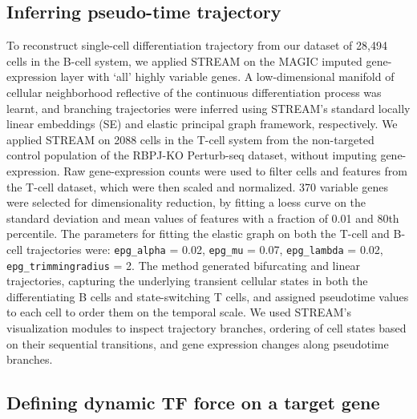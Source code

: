 \documentclass[11pt]{article}
\begin{document}
\subsection*{Inferring pseudo-time trajectory}

To reconstruct single-cell differentiation trajectory from our dataset of 28,494 cells
in the B-cell system, we applied STREAM on the MAGIC imputed gene-expression layer with
`all' highly variable genes. A low-dimensional manifold of cellular neighborhood
reflective of the continuous differentiation process was learnt, and branching
trajectories were inferred using STREAM's standard locally linear embeddings (SE) and
elastic principal graph framework, respectively. We applied STREAM on 2088 cells in the
T-cell system from the non-targeted control population of the RBPJ-KO Perturb-seq
dataset, without imputing gene-expression. Raw gene-expression counts were used to filter
cells and features from the T-cell dataset, which were then scaled and normalized. 370
variable genes were selected for dimensionality reduction, by fitting a loess curve on
the standard deviation and mean values of features with a fraction of 0.01 and 80th
percentile. The parameters for fitting the elastic graph on both the T-cell and B-cell
trajectories were: \texttt{epg\_alpha} = 0.02, \texttt{epg\_mu} = 0.07,
\texttt{epg\_lambda} = 0.02, \texttt{epg\_trimmingradius} = 2. The method generated
bifurcating and linear trajectories, capturing the underlying transient cellular states
in both the differentiating B cells and state-switching T cells, and assigned pseudotime
values to each cell to order them on the temporal scale. We used STREAM's visualization
modules to inspect trajectory branches, ordering of cell states based on their sequential
transitions, and gene expression changes along pseudotime branches.

\subsection*{Defining dynamic TF force on a target gene}

%
%
\end{document}
